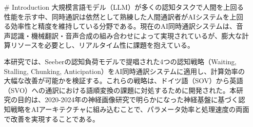# Introduction
大規模言語モデル（LLM）が多くの認知タスクで人間を上回る性能を示す中、同時通訳は依然として熟練した人間通訳者がAIシステムを上回る効率性と精度を維持している分野である。現在のAI同時通訳システムは、音声認識・機械翻訳・音声合成の組み合わせによって実現されているが、膨大な計算リソースを必要とし、リアルタイム性に課題を抱えている。

本研究では、Seeberの認知負荷モデルで提唱された4つの認知戦略（Waiting, Stalling, Chunking, Anticipation）をAI同時通訳システムに適用し、計算効率の大幅な改善が可能かを検証する。これらの戦略は、ドイツ語（SOV）から英語（SVO）への通訳における語順変換の課題に対処するために開発された。本研究の目的は、2020-2024年の神経画像研究で明らかになった神経基盤に基づく認知戦略をAIアーキテクチャに組み込むことで、パラメータ効率と処理速度の両面で改善を実現することである。